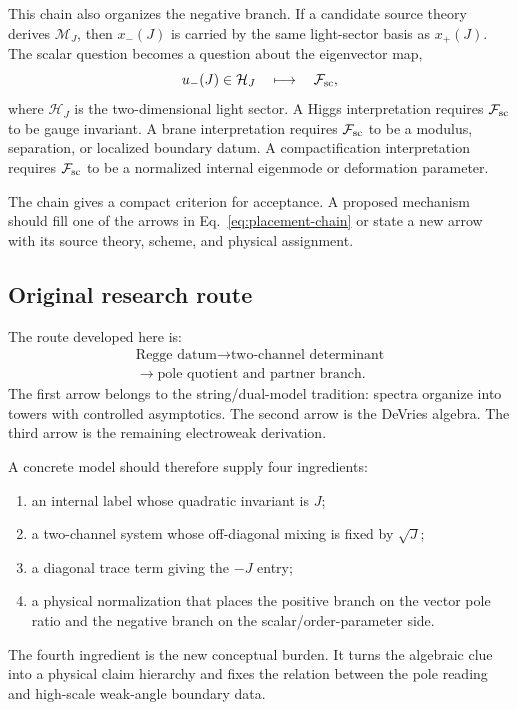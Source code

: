 This chain also organizes the negative branch.  If a candidate source theory derives \(\mathcal M_J\), then \(x_-(J)\) is carried by the same light-sector basis as \(x_+(J)\).  The scalar question becomes a question about the eigenvector map,
\begin{equation}
  u_-(J)\in\mathcal H_J
  \quad\longmapsto\quad
  \mathcal F_{\rm sc},
  \label{eq:negative-eigenvector-chain}
\end{equation}
where \(\mathcal H_J\) is the two-dimensional light sector.  A Higgs interpretation requires \(\mathcal F_{\rm sc}\) to be gauge invariant.  A brane interpretation requires \(\mathcal F_{\rm sc}\) to be a modulus, separation, or localized boundary datum.  A compactification interpretation requires \(\mathcal F_{\rm sc}\) to be a normalized internal eigenmode or deformation parameter.

The chain gives a compact criterion for acceptance.  A proposed mechanism should fill one of the arrows in Eq.~\eqref{eq:placement-chain} or state a new arrow with its source theory, scheme, and physical assignment.

\subsection{Original research route}

The route developed here is:
\begin{equation}
  \begin{gathered}
  \text{Regge datum}
  \longrightarrow
  \text{two-channel determinant}
  \\
  \longrightarrow
  \text{pole quotient and partner branch}.
  \end{gathered}
  \label{eq:research-route}
\end{equation}
The first arrow belongs to the string/dual-model tradition: spectra organize into towers with controlled asymptotics.  The second arrow is the DeVries algebra.  The third arrow is the remaining electroweak derivation.

A concrete model should therefore supply four ingredients:
\begin{enumerate}
\item an internal label whose quadratic invariant is \(J\);
\item a two-channel system whose off-diagonal mixing is fixed by \(\sqrt J\);
\item a diagonal trace term giving the \(-J\) entry;
\item a physical normalization that places the positive branch on the vector pole ratio and the negative branch on the scalar/order-parameter side.
\end{enumerate}

The fourth ingredient is the new conceptual burden.  It turns the algebraic clue into a physical claim hierarchy and fixes the relation between the pole reading and high-scale weak-angle boundary data.
